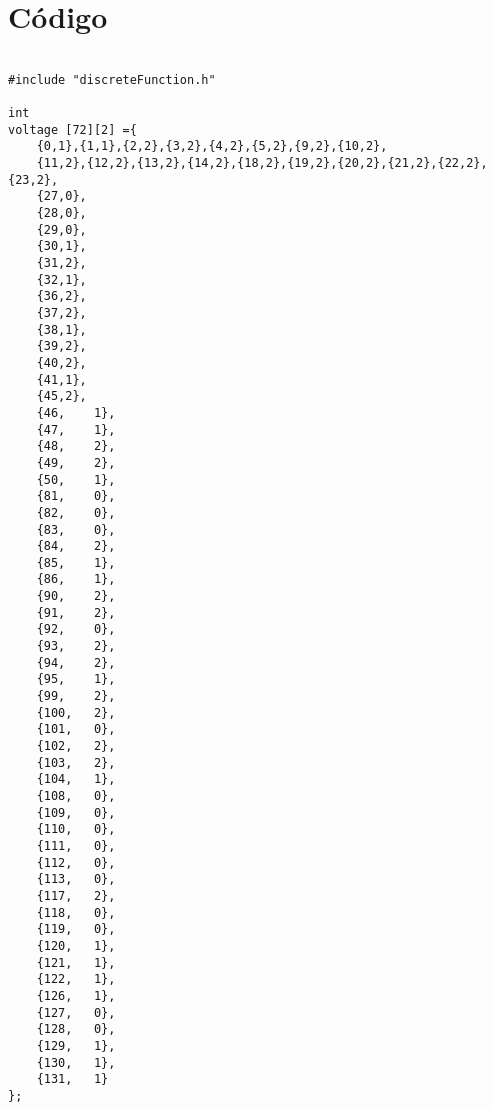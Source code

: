 \chapter{Código}\label{ch:appendix}

\begin{lstlisting}[caption=Modelo discreto de la vía de señalización. Implementación en C]

#include "discreteFunction.h"

int
voltage [72][2] ={
	{0,1},{1,1},{2,2},{3,2},{4,2},{5,2},{9,2},{10,2},
	{11,2},{12,2},{13,2},{14,2},{18,2},{19,2},{20,2},{21,2},{22,2},{23,2},
	{27,0},
	{28,0},
	{29,0},
	{30,1},
	{31,2},
	{32,1},
	{36,2},
	{37,2},
	{38,1},
	{39,2},
	{40,2},
	{41,1},
	{45,2},
	{46,	1},
	{47,	1},
	{48,	2},
	{49,	2},
	{50,	1},
	{81,	0},
	{82,	0},
	{83,	0},
	{84,	2},
	{85,	1},
	{86,	1},
	{90,	2},
	{91,	2},
	{92,	0},
	{93,	2},
	{94,	2},
	{95,	1},
	{99,	2},
	{100,	2},
	{101,	0},
	{102,	2},
	{103,	2},
	{104,	1},
	{108,	0},
	{109,	0},
	{110,	0},
	{111,	0},
	{112,	0},
	{113,	0},
	{117,	2},
	{118,	0},
	{119,	0},
	{120,	1},
	{121,	1},
	{122,	1},
	{126,	1},
	{127,	0},
	{128,	0},
	{129,	1},
	{130,	1},
	{131,	1}
};


\end{lstlisting}
